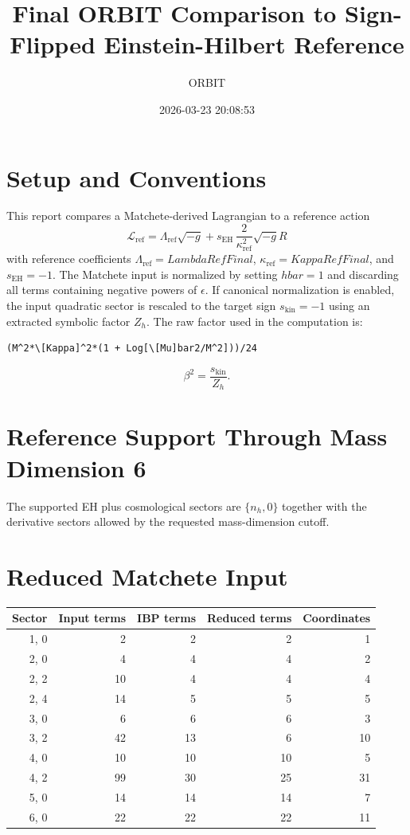 \documentclass[11pt]{article}
\title{Final ORBIT Comparison to Sign-Flipped Einstein-Hilbert Reference}
\author{ORBIT}
\date{2026-03-23 20:08:53}
\begin{document}
\maketitle
\tableofcontents
\section{Setup and Conventions}
This report compares a Matchete-derived Lagrangian to a reference action
\begin{equation}
\mathcal{L}_{\mathrm{ref}} = \Lambda_{\mathrm{ref}} \sqrt{-g} + s_{\mathrm{EH}}\, \frac{2}{\kappa_{\mathrm{ref}}^2} \sqrt{-g} R
\end{equation}
with reference coefficients $\Lambda_{\mathrm{ref}} = LambdaRefFinal$, $\kappa_{\mathrm{ref}} = KappaRefFinal$, and $s_{\mathrm{EH}} = -1$.
The Matchete input is normalized by setting $hbar = 1$ and discarding all terms containing negative powers of $\epsilon$.
If canonical normalization is enabled, the input quadratic sector is rescaled to the target sign $s_{\mathrm{kin}} = -1$ using an extracted symbolic factor $Z_h$. The raw factor used in the computation is:
\begin{verbatim}
(M^2*\[Kappa]^2*(1 + Log[\[Mu]bar2/M^2]))/24
\end{verbatim}
\begin{equation}
\beta^2 = \frac{s_{\mathrm{kin}}}{Z_h}.
\end{equation}
\section{Reference Support Through Mass Dimension 6}
The supported EH plus cosmological sectors are $\{n_h, 0\}$ together with the derivative sectors allowed by the requested mass-dimension cutoff.
\section{Reduced Matchete Input}
\begin{longtable}{rrrrr}
\toprule
Sector & Input terms & IBP terms & Reduced terms & Coordinates \\
\midrule
{1, 0} & 2 & 2 & 2 & 1 \\
{2, 0} & 4 & 4 & 4 & 2 \\
{2, 2} & 10 & 4 & 4 & 4 \\
{2, 4} & 14 & 5 & 5 & 5 \\
{3, 0} & 6 & 6 & 6 & 3 \\
{3, 2} & 42 & 13 & 6 & 10 \\
{4, 0} & 10 & 10 & 10 & 5 \\
{4, 2} & 99 & 30 & 25 & 31 \\
{5, 0} & 14 & 14 & 14 & 7 \\
{6, 0} & 22 & 22 & 22 & 11 \\
\bottomrule
\end{longtable}
\end{document}
